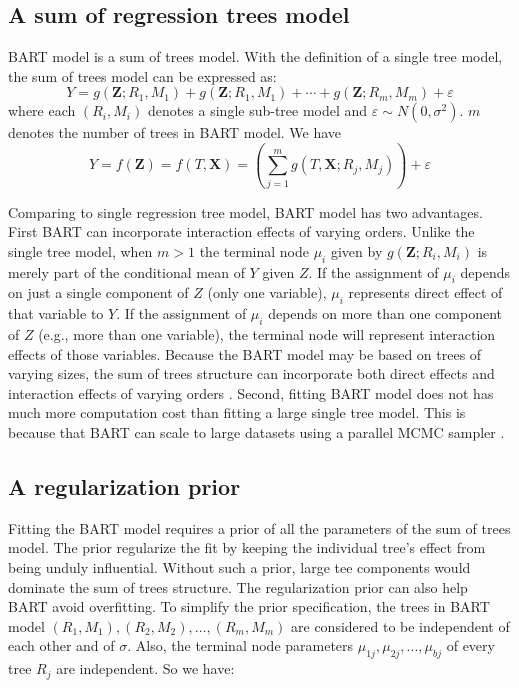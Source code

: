 \subsection{A sum of regression trees model}
BART model is a sum of trees model. With the definition of a single tree model, the sum of trees model can be expressed as:
\begin{equation*}
Y = g(\pmb{Z};{R_1},{M_1}) + g(\pmb{Z};{R_1},{M_1}) +  \cdots  + g(\pmb{Z};{R_m},{M_m}) + \varepsilon
\end{equation*}
where each $(R_i,M_i)$ denotes a single sub-tree model and $\varepsilon  \sim N(0,{\sigma ^2})$.  $m$ denotes the number of trees in BART model. We have
 \begin{equation*}
 Y =f(\pmb{Z})=f(T,\pmb{X})= \left( {\sum\limits_{j = 1}^m {g(T,\pmb{X};{R_j},{M_j})} } \right) + \varepsilon
 \end{equation*}

Comparing to single regression tree model, BART model has two advantages. First BART can incorporate interaction effects of varying orders. Unlike the single tree model, when $m>1$ the terminal node $\mu_i$ given by $g(\pmb{Z};{R_i},{M_i})$ is merely part of the conditional mean of $Y$ given $Z$. If the assignment of $\mu_i$ depends on just a single component of $Z$ (only one variable),  $\mu_i$  represents direct effect of that variable to $Y$. If the assignment of $\mu_i$ depends on more than one component of $Z$ (e.g., more than one variable), the terminal node will represent interaction effects of those variables. Because the BART model may be based on trees of varying sizes, the sum of trees structure can incorporate both direct effects and interaction effects of varying orders \cite{conference1997advances}. Second, fitting BART model does not has much more computation cost than fitting a large single tree model. This is because that BART can scale to large datasets using a parallel MCMC sampler \cite{pratola2014parallel, pratola2015bayesian}.  

\subsection{A regularization prior}
Fitting the BART model requires a prior of all the parameters of the sum of trees model.  The prior regularize the fit by keeping the individual tree's effect from being unduly influential. Without such a prior, large  tee components would dominate the sum of trees structure. The regularization prior can also help BART avoid overfitting. To simplify the prior specification, the trees in BART model $(R_1, M_1), (R_2,M_2), \ldots, (R_m, M_m) $ are considered to be independent of each other and of $\sigma$. Also, the terminal node parameters $ \mu _{1j}, \mu _{2j}, . . ., \mu _{bj} $ of every tree $R_j$ are independent. So we have:

